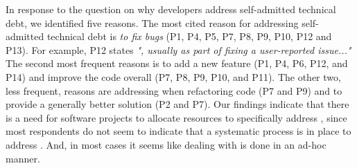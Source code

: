 In response to the question on why developers address self-admitted technical debt, we identified five reasons. The most cited reason for addressing self-admitted technical debt is \emph{to fix bugs} (P1, P4, P5, P7, P8, P9, P10, P12 and P13). For example, P12 states \textit{", usually as part of fixing a user-reported issue..."} The second most frequent reasons is to add a new feature (P1, P4, P6, P12, and P14) and improve the code overall (P7, P8, P9, P10, and P11). The other two, less frequent, reasons are addressing \SATD when refactoring code (P7 and P9) and to provide a generally better solution (P2 and P7). Our findings indicate that there is a need for software projects to allocate resources to specifically address \SATD, since most respondents do not seem to indicate that a systematic process is in place to address \SATD. And, in most cases it seems like dealing with \SATD is done in an ad-hoc manner.



 
 
 
 
 
% 
 
 